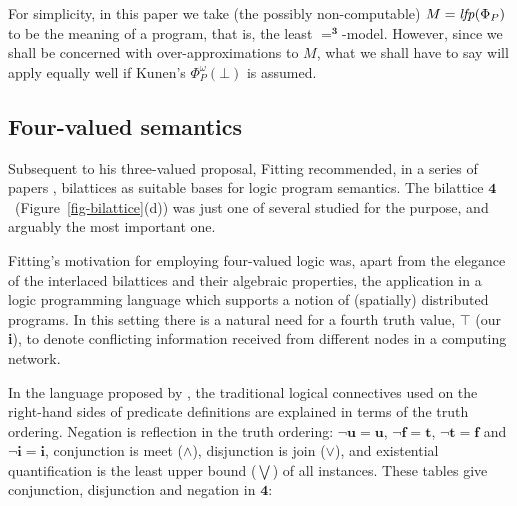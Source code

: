 \documentclass{tlp}
\newcommand{\Tri}{\ensuremath{\mathbf{3}}}
\newcommand{\Quad}{\ensuremath{\mathbf{4}}}
\newcommand{\ident}[1]{\mbox{\textit{#1}}}
\begin{document}
For simplicity, in this paper we take (the possibly non-computable) 
$M = \ident{lfp}(\Phi_P)$ to be the meaning of a program, that is, the
least $=^\Tri$-model.
However, since we shall be concerned with over-approximations to
$M$, what we shall have to say will apply equally well if Kunen's
$\Phi_P^\omega(\bot)$ is assumed.





\subsection{Four-valued semantics}
\label{sec-four}

Subsequent to his three-valued proposal, Fitting recommended,
in a series of papers 
\citeyear{fitting:Fund_Info_1988,fitting:LICS1989,fitting:JLC_1991,fitting:JLP_1991,fitting:TCS_2002},
bilattices as suitable bases for logic program semantics.
The bilattice \Quad\ (Figure~\ref{fig-bilattice}(d)) was just one of 
several studied for the purpose, and arguably the most important one.


Fitting's motivation for employing four-valued logic was, apart from
the elegance of the interlaced bilattices and their algebraic
properties, the application in a logic programming language which
supports a notion of (spatially) distributed programs. 
In this setting there is a natural need for a fourth truth value, $\top$
(our \textbf{i}), to denote conflicting information received from
different nodes in a computing network.

In the language proposed by , 
the traditional logical connectives used on the 
right-hand sides of predicate definitions are explained in terms 
of the truth ordering.
Negation is reflection in the truth ordering: 
$\neg \textbf{u} = \textbf{u}$, $\neg \textbf{f} = \textbf{t}$, 
$\neg \textbf{t} = \textbf{f}$ and $\neg \textbf{i} = \textbf{i}$,
conjunction is meet ($\land$), disjunction is join ($\lor$), and 
existential quantification is the least upper bound ($\bigvee$) of 
all instances.
These tables give conjunction, disjunction and negation in \Quad:
\medskip
\end{document}
